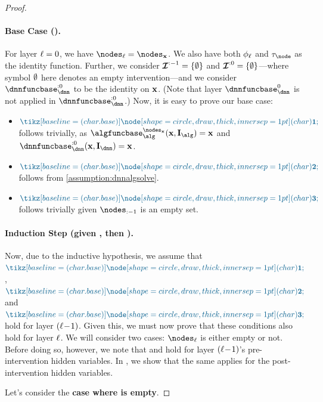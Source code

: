 \begin{proof}
    \paragraph{Base Case ().}
    For layer $\ell=0$, 
    we have $\nodes_{\layer} = \nodesinput$.
    We also have both $\phi_{\ell}$ and $\abstractionmap_{\node}$ as the identity function.
    Further, we consider $\boldsymbol{\mathcal{I}}^{:-1}=\{\emptyset\}$ and $\boldsymbol{\mathcal{I}}^{:0}=\{\emptyset\}$---where symbol $\emptyset$ here denotes an empty intervention---and we consider $\dnnfunclayer{:0}$ to be the identity on $\mathbf{x}$. 
    (Note that layer $\dnnfunclayer{0}$ is not applied in $\dnnfunclayer{:0}$.)
    Now, it is easy to prove our base case:
    \begin{itemize}
        \item $\inductioncircle{1}$ follows trivially, as 
    $\algfuncnode{\nodesinput}(\bx, \interventionsalg) = \bx$ and $\dnnfunclayer{:0}(\bx, \interventionsdnn) = \bx$.
        \item $\inductioncircle{2}$ follows from \cref{assumption:dnnalgsolve}.
        \item $\inductioncircle{3}$ follows trivially given $\nodes_{:-1}$ is an empty set. 
    \end{itemize}
    

    \paragraph{Induction Step (given , then \boldsymbol{$\layer$}).}
    Now, due to the inductive hypothesis, we assume that $\inductioncircle{1}$, $\inductioncircle{2}$ and $\inductioncircle{3}$ hold for layer $(\ell\!-\!1)$.
    Given this, we must now prove that these conditions also hold for layer $\layer$.
    We will consider two cases: $\nodes_\layer$ is either empty or not.
    Before doing so, however, we note that  and  hold for layer $(\ell\!-\!1)$'s pre-intervention hidden variables.
    In , we show that the same applies for the post-intervention hidden variables.

    Let's consider the \textbf{case where \boldsymbol{$\nodes_\layer$} is empty}.
    

\end{proof}
